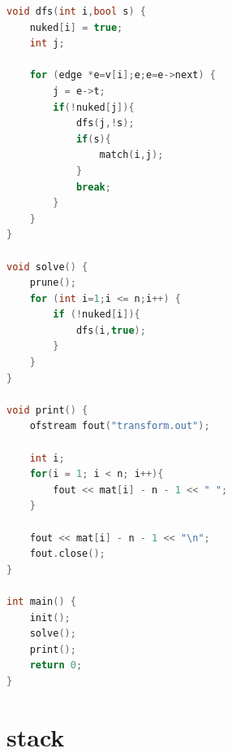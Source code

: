 \documentclass[12pt,twiside,a4paper]{ctexbook}
\numberwithin{chapter}{part}
\begin{document}
\begin{lstlisting}[language=c++,breaklines=true]
void dfs(int i,bool s) { 
	nuked[i] = true; 
	int j; 

	for (edge *e=v[i];e;e=e->next) { 
		j = e->t; 
		if(!nuked[j]){ 
			dfs(j,!s); 
			if(s){
				match(i,j); 
			}
			break; 
		} 
	} 
}

void solve() { 
	prune(); 
	for (int i=1;i <= n;i++) { 
		if (!nuked[i]){
			dfs(i,true); 
		} 
	}
}

void print() {
    ofstream fout("transform.out");

    int i;
    for(i = 1; i < n; i++){
	    fout << mat[i] - n - 1 << " ";
    }

    fout << mat[i] - n - 1 << "\n";
    fout.close();
}

int main() {
    init();
    solve();
    print();
    return 0;
}
\end{lstlisting}

\chapter{stack}
\end{document}
